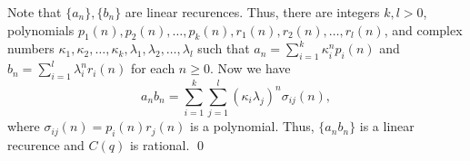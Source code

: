 \documentclass[12pt]{article}
\begin{document}
Note that $\{a_n\},\{b_n\}$ are linear recurences. Thus, there are integers $k,l>0$, polynomials $p_1(n),p_2(n),\hdots,p_k(n),r_1(n),r_2(n),\hdots, r_l(n)$, and complex numbers $\kappa_1,\kappa_2,\hdots,\kappa_k,\lambda_1,\lambda_2,\hdots,\lambda_l$ such that $a_n=\sum_{i=1}^k \kappa_i^np_i(n)$ and $b_n=\sum_{i=1}^l \lambda_i^n r_i(n)$ for each $n\ge0$. Now we have 
$$a_nb_n=\sum_{i=1}^k \sum_{j=1}^l \left(\kappa_i\lambda_j\right)^n \sigma_{ij}(n),$$
where $\sigma_{ij}(n)=p_i(n)r_j(n)$ is a polynomial. Thus, $\{a_nb_n\}$ is a linear recurence and $C(q)$ is rational. \qed
\end{document}
